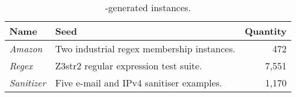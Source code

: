 \begin{table}[t]
    \begin{subtable}{1\textwidth}
        \centering
        \caption{\transformer{}-generated instances.}
        \label{tbl:transformed}
        \begin{tabular}{llr}
            \toprule
            \textbf{Name}      & \textbf{Seed}                              & \textbf{Quantity} \\
            \midrule
            \textit{Amazon}    & Two industrial regex membership instances. & 472 \\
            \textit{Regex}     & Z3str2 regular expression test suite.      & 7,551 \\
            \textit{Sanitizer} & Five e-mail and IPv4 sanitiser examples.   & 1,170 \\
            \bottomrule
        \end{tabular}
    \end{subtable}
\end{table}
